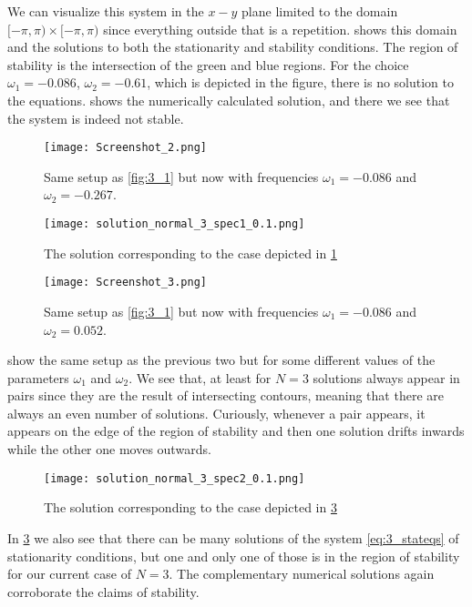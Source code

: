 \documentclass[10pt,a4paper,twocolumn]{article}
\begin{document}
We can visualize this system in the $x-y$ plane limited to the domain $[-\pi,\pi) \times [-\pi,\pi)$ since everything outside that is a repetition.  shows this domain and the solutions to both the stationarity and stability conditions. The region of stability is the intersection of the green and blue regions. For the choice $\omega_1 = -0.086$, $\omega_2 = -0.61$, which is depicted in the figure, there is no solution to the equations.  shows the numerically calculated solution, and there we see that the system is indeed not stable.

\begin{figure}[!b]
    \centering
    \texttt{[image: Screenshot\_2.png]}
    \caption{Same setup as \cref{fig:3_1} but now with frequencies $\omega_1 = -0.086$ and $\omega_2 = -0.267$.}
    \label{fig:3_2}
\end{figure}

\begin{figure}[!h]
    \centering
    \texttt{[image: solution\_normal\_3\_spec1\_0.1.png]}
    \caption{The solution corresponding to the case depicted in \cref{fig:3_2}}
    \label{fig:3_2_sol}
\end{figure}

\begin{figure}[!b]
    \centering
    \texttt{[image: Screenshot\_3.png]}
    \caption{Same setup as \cref{fig:3_1} but now with frequencies $\omega_1 = -0.086$ and $\omega_2 = 0.052$.}
    \label{fig:3_3}
\end{figure}

 show the same setup as the previous two but for some different values of the parameters $\omega_1$ and $\omega_2$. We see that, at least for $N=3$ solutions always appear in pairs since they are the result of intersecting contours, meaning that there are always an even number of solutions. Curiously, whenever a pair appears, it appears on the edge of the region of stability and then one solution drifts inwards while the other one moves outwards.

\begin{figure}[!t]
    \centering
    \texttt{[image: solution\_normal\_3\_spec2\_0.1.png]}
    \caption{The solution corresponding to the case depicted in \cref{fig:3_3}}
    \label{fig:3_3_sol}
\end{figure}

In \cref{fig:3_3} we also see that there can be many solutions of the system \cref{eq:3_stateqs} of stationarity conditions, but one and only one of those is in the region of stability for our current case of $N=3$. The complementary numerical solutions again corroborate the claims of stability.
\end{document}
